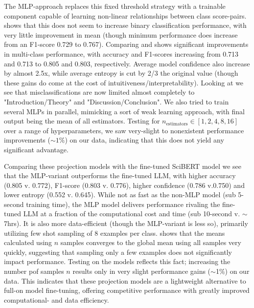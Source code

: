 The MLP-approach replaces this fixed threshold strategy with a trainable component capable of learning non-linear relationships between class score-pairs.  shows that this does not seem to increase binary classification performance, with very little improvement in mean (though minimum performance does increase from an F1-score 0.729 to 0.767). Comparing  and  shows significant improvements in multi-class performance, with accuracy and F1-scores increasing from 0.713 and 0.713 to 0.805 and 0.803, respectively. Average model confidence also increase by almost 2.5x, while average entropy is cut by 2/3 the original value (though these gains do come at the cost of intuitiveness/interpretability). Looking at  we see that misclassifications are now limited almost completely to "Introduction/Theory" and "Discussion/Conclusion". We also tried to train several MLPs in parallel, mimicking a sort of weak learning approach, with final output being the mean of all estimators. Testing for $n_{\text{estimators}}\in [1, 2, 4, 8, 16]$ over a range of hyperparameters, we saw very-slight to nonexistent performance improvements ($\sim 1\%$) on our data, indicating that this does not yield any significant advantage.


Comparing these projection models with the fine-tuned SciBERT model we see that the MLP-variant outperforms the fine-tuned LLM, with higher accuracy (0.805 v. 0.772), F1-score (0.803 v. 0.776), higher confidence (0.786 v.0.750) and lower entropy (0.552 v. 0.645). While not as fast as the non-MLP model (sub 5-second training time), the MLP model delivers performance rivaling the fine-tuned LLM at a fraction of the computational cost and time (sub 10-second v. $\sim$7hrs). It is also more data-efficient (though the MLP-variant is less so), primarily utilizing few shot sampling of 8 examples per class.  shows that the means calculated using $n$ samples converges to the global mean using all samples very quickly, suggesting that sampling only a few examples does not significantly impact performance. Testing on the models reflects this fact; increasing the number pof samples $n$ results only in very slight performance gains ($\sim$1\%) on our data. This indicates that these projection models are a lightweight alternative to full-on model fine-tuning, offering competitive performance with greatly improved computational- and data efficiency.


